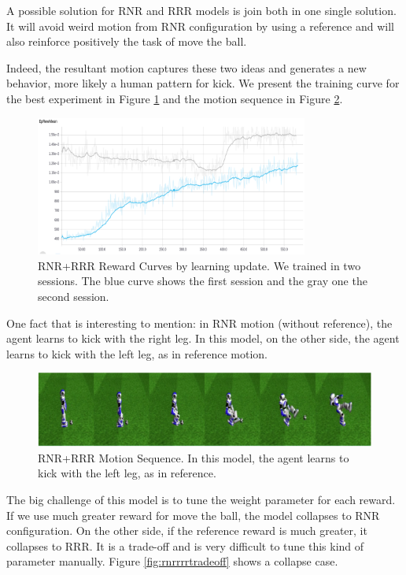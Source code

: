 A possible solution for RNR and RRR models is join both in one single solution. It will avoid weird motion from RNR configuration by using a reference and will also reinforce positively the task of move the ball.

Indeed, the resultant motion captures these two ideas and generates a new behavior, more likely a human pattern for kick. We present the training curve for the best experiment in Figure \ref{fig:rnrrrrrewardcurve} and the motion sequence in Figure \ref{fig:rnrrrrreward}.

\begin{figure}[!htbp]
	\centering
	\includegraphics[width=0.8\textwidth]{Cap6/rnrrrrrewardcurve.eps}
	\caption{RNR+RRR Reward Curves by learning update. We trained in two sessions. The blue curve shows the first session and the gray one the second session.}
	\label{fig:rnrrrrrewardcurve}
\end{figure}

One fact that is interesting to mention: in RNR motion (without reference), the agent learns to kick with the right leg. In this model, on the other side, the agent learns to kick with the left leg, as in reference motion.

\begin{figure}[!htbp]
	\centering
	\includegraphics[width=1.0\textwidth]{Cap6/rnrrrrreward.eps}
	\caption{RNR+RRR Motion Sequence. In this model, the agent learns to kick with the left leg, as in reference.}
	\label{fig:rnrrrrreward}
\end{figure}


The big challenge of this model is to tune the weight parameter for each reward. If we use much greater reward for move the ball, the model collapses to RNR configuration. On the other side, if the reference reward is much greater, it collapses to RRR. It is a trade-off and is very difficult to tune this kind of parameter manually. Figure \ref{fig:rnrrrrtradeoff} shows a collapse case.


